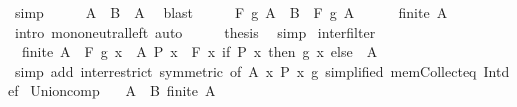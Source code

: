 \begin{isabellebody}
\ simp\isanewline
\ \ \isamarkupfalse%
\ \isamarkupfalse%
\ {\isachardoublequoteopen}A\ {\isasyminter}\ B\ {\isasymsubseteq}\ A{\isachardoublequoteclose}\ \isamarkupfalse%
\ blast\isanewline
\ \ \isamarkupfalse%
\ \isamarkupfalse%
\ {\isachardoublequoteopen}F\ {\isacharquery}{\kern0pt}g\ {\isacharparenleft}{\kern0pt}A\ {\isasyminter}\ B{\isacharparenright}{\kern0pt}\ {\isacharequal}{\kern0pt}\ F\ {\isacharquery}{\kern0pt}g\ A{\isachardoublequoteclose}\isanewline
\ \ \ \ \isamarkupfalse%
\ {\isacartoucheopen}finite\ A{\isacartoucheclose}\ \isamarkupfalse%
\ {\isacharparenleft}{\kern0pt}intro\ mono{\isacharunderscore}{\kern0pt}neutral{\isacharunderscore}{\kern0pt}left{\isacharparenright}{\kern0pt}\ auto\isanewline
\ \ \isamarkupfalse%
\ \isamarkupfalse%
\ {\isacharquery}{\kern0pt}thesis\ \isamarkupfalse%
\ simp\isanewline
{}\isamarkupfalse%
%
\endisatagproof
{\isafoldproof}%
%
\isadelimproof
\isanewline
%
\endisadelimproof
\isanewline
{}\isamarkupfalse%
\ inter{\isacharunderscore}{\kern0pt}filter{\isacharcolon}{\kern0pt}\isanewline
\ \ {\isachardoublequoteopen}finite\ A\ {\isasymLongrightarrow}\ F\ g\ {\isacharbraceleft}{\kern0pt}x\ {\isasymin}\ A{\isachardot}{\kern0pt}\ P\ x{\isacharbraceright}{\kern0pt}\ {\isacharequal}{\kern0pt}\ F\ {\isacharparenleft}{\kern0pt}{\isasymlambda}x{\isachardot}{\kern0pt}\ if\ P\ x\ then\ g\ x\ else\ \ A{\isachardoublequoteclose}\isanewline
%
\isadelimproof
\ \ %
\endisadelimproof
%
\isatagproof
{}\isamarkupfalse%
\ {\isacharparenleft}{\kern0pt}simp\ add{\isacharcolon}{\kern0pt}\ inter{\isacharunderscore}{\kern0pt}restrict\ {\isacharbrackleft}{\kern0pt}symmetric{\isacharcomma}{\kern0pt}\ of\ A\ {\isachardoublequoteopen}{\isacharbraceleft}{\kern0pt}x{\isachardot}{\kern0pt}\ P\ x{\isacharbraceright}{\kern0pt}{\isachardoublequoteclose}\ g{\isacharcomma}{\kern0pt}\ simplified\ mem{\isacharunderscore}{\kern0pt}Collect{\isacharunderscore}{\kern0pt}eq{\isacharbrackright}{\kern0pt}\ Int{\isacharunderscore}{\kern0pt}def{\isacharparenright}{\kern0pt}%
\endisatagproof
{\isafoldproof}%
%
\isadelimproof
\isanewline
%
\endisadelimproof
\isanewline
{}\isamarkupfalse%
\ Union{\isacharunderscore}{\kern0pt}comp{\isacharcolon}{\kern0pt}\isanewline
\ \ \ {\isachardoublequoteopen}{\isasymforall}A\ {\isasymin}\ B{\isachardot}{\kern0pt}\ finite\ A{\isachardoublequoteclose}\isanewline

\end{isabellebody}
